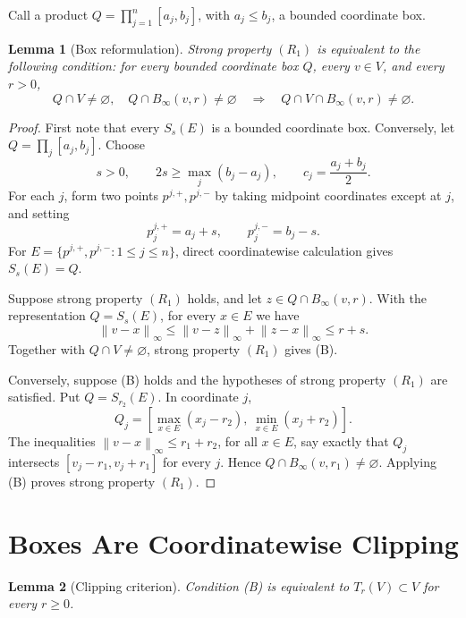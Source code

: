 \documentclass[11pt]{article}
\newtheorem{lemma}{Lemma}
\theoremstyle{definition}
\newcommand{\norm}[1]{\left\lVert #1\right\rVert_\infty}
\begin{document}
Call a product \(Q=\prod_{j=1}^n[a_j,b_j]\), with \(a_j\le b_j\), a bounded
coordinate box.

\begin{lemma}[Box reformulation]\label{lem:boxes}
Strong property \((R_1)\) is equivalent to the following condition:
for every bounded coordinate box \(Q\), every \(v\in V\), and every \(r>0\),
\[
 Q\cap V\ne\varnothing,\quad Q\cap B_\infty(v,r)\ne\varnothing
 \quad\Longrightarrow\quad
 Q\cap V\cap B_\infty(v,r)\ne\varnothing.
\tag{B}
\]
\end{lemma}

\begin{proof}
First note that every \(S_s(E)\) is a bounded coordinate box.  Conversely,
let \(Q=\prod_j[a_j,b_j]\).  Choose
\[
 s>0,\qquad 2s\ge\max_j(b_j-a_j),
 \qquad c_j=\frac{a_j+b_j}{2}.
\]
For each \(j\), form two points \(p^{j,+},p^{j,-}\) by taking midpoint
coordinates except at \(j\), and setting
\[
 p^{j,+}_j=a_j+s,\qquad p^{j,-}_j=b_j-s.
\]
For \(E=\{p^{j,+},p^{j,-}:1\le j\le n\}\), direct coordinatewise
calculation gives \(S_s(E)=Q\).

Suppose strong property \((R_1)\) holds, and let
\(z\in Q\cap B_\infty(v,r)\).  With the representation \(Q=S_s(E)\), for
every \(x\in E\) we have
\[
 \norm{v-x}\le\norm{v-z}+\norm{z-x}\le r+s.
\]
Together with \(Q\cap V\ne\varnothing\), strong property \((R_1)\) gives
(B).

Conversely, suppose (B) holds and the hypotheses of strong property
\((R_1)\) are satisfied.  Put \(Q=S_{r_2}(E)\).  In coordinate \(j\),
\[
 Q_j=\left[\max_{x\in E}(x_j-r_2),\ 
              \min_{x\in E}(x_j+r_2)\right].
\]
The inequalities \(\norm{v-x}\le r_1+r_2\), for all \(x\in E\), say exactly
that \(Q_j\) intersects \([v_j-r_1,v_j+r_1]\) for every \(j\).  Hence
\(Q\cap B_\infty(v,r_1)\ne\varnothing\).  Applying (B) proves strong
property \((R_1)\).
\end{proof}

\section{Boxes Are Coordinatewise Clipping}

\begin{lemma}[Clipping criterion]\label{lem:clip}
Condition \emph{(B)} is equivalent to \(T_r(V)\subset V\) for every \(r\ge0\).
\end{lemma}
\end{document}
